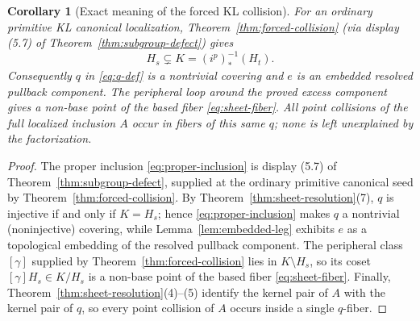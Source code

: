 \documentclass[11pt,reqno]{amsart}
\newtheorem{corollary}[theorem]{Corollary}
\theoremstyle{definition}
\theoremstyle{remark}
\begin{document}
\begin{corollary}[Exact meaning of the forced KL collision]\label{cor:forced-collision-meaning}
For an ordinary primitive KL canonical localization,
Theorem~\ref{thm:forced-collision} (via display (5.7) of
Theorem~\ref{thm:subgroup-defect}) gives
\begin{equation}\label{eq:proper-inclusion}
  H_s\subsetneq K=(i^{p})_*^{-1}(H_t).
\end{equation}
Consequently \( q \) in \eqref{eq:q-def} is a nontrivial covering and \( e \) is an embedded resolved pullback component.  The peripheral loop around the proved excess component gives a non-base point of the based fiber \eqref{eq:sheet-fiber}.  All point collisions of the full localized inclusion \( A \) occur in fibers of this same \( q \); none is left unexplained by the factorization.
\end{corollary}

\begin{proof}
The proper inclusion \eqref{eq:proper-inclusion} is display (5.7) of Theorem~\ref{thm:subgroup-defect}, supplied at the ordinary primitive canonical seed by Theorem~\ref{thm:forced-collision}.  By Theorem~\ref{thm:sheet-resolution}(7), \( q \) is injective if and only if \( K=H_s \); hence \eqref{eq:proper-inclusion} makes \( q \) a nontrivial (noninjective) covering, while Lemma~\ref{lem:embedded-leg} exhibits \( e \) as a topological embedding of the resolved pullback component.  The peripheral class \( [\gamma] \) supplied by Theorem~\ref{thm:forced-collision} lies in \( K\setminus H_s \), so its coset \( [\gamma]H_s\in K/H_s \) is a non-base point of the based fiber \eqref{eq:sheet-fiber}.  Finally, Theorem~\ref{thm:sheet-resolution}(4)--(5) identify the kernel pair of \( A \) with the kernel pair of \( q \), so every point collision of \( A \) occurs inside a single \( q \)-fiber.
\end{proof}
\end{document}
